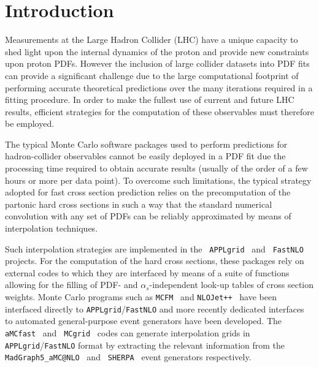 \documentclass[preprint,12pt]{elsarticle}
\begin{document}
\clearpage


\section{Introduction}\label{sec:intro}

Measurements at the Large Hadron Collider (LHC) have a unique capacity to shed light upon the internal dynamics 
of the proton and provide new constraints upon proton PDFs. However the inclusion of large collider datasets 
into PDF fits can provide a significant challenge due to the large computational footprint of performing accurate
theoretical predictions over the many iterations required in a fitting procedure. In order to make the fullest use of current 
and future LHC results, efficient strategies for the computation of these observables must therefore be employed. 

The typical Monte Carlo software packages used to perform predictions for 
hadron-collider observables cannot be easily deployed in a PDF fit due the processing time 
required to obtain accurate results (usually of the order of a few hours or more per data
point). To overcome such limitations, the typical strategy
adopted for fast cross section prediction relies on the precomputation
of the partonic hard cross sections in such a way that the standard numerical
convolution with any set of PDFs can be reliably approximated by means of
interpolation techniques.

Such interpolation strategies are implemented in the {\tt
  APPLgrid}~\cite{Carli:2010rw} and {\tt
  FastNLO}~\cite{Wobisch:2011ij} projects. For the computation of the
hard cross sections, these packages rely on external codes to which
they are interfaced by means of a suite of functions allowing for the
filling of PDF- and $\alpha_s$-independent look-up tables of
cross section weights. Monte Carlo programs such as {\tt MCFM}~\cite{Campbell:2010ff}
and {\tt NLOJet++}~\cite{Nagy:2003tz} have been interfaced directly to
{\tt APPLgrid}/{\tt FastNLO} and more recently de\-di\-ca\-ted
interfaces to automated general-purpose event
generators have been developed. The {\tt
  aMCfast}~\cite{Bertone:2014zva} and {\tt
  MCgrid}~\cite{DelDebbio:2013kxa} codes can generate interpolation grids in {\tt APPLgrid}/{\tt FastNLO} format 
 by extracting the relevant information from the {\tt
  MadGraph5\_aMC@NLO}~\cite{Alwall:2014hca} and {\tt
  SHERPA}~\cite{Gleisberg:2008ta} event generators respectively.
\end{document}
